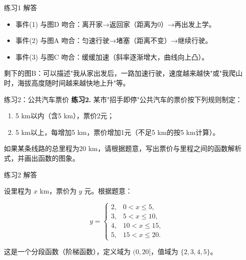 \documentclass[10pt,aspectratio=169,serif]{beamer}
\begin{document}
\begin{frame}[t]{练习1 解答}
\begin{tcolorbox}[colback=orange!10,colframe=orange,title=\textbf{解:}]
\begin{itemize}
  \item 事件(1) 与图\alert{D} 吻合：离开家→返回家（距离为0）→再出发上学。
  \item 事件(2) 与图\alert{A} 吻合：匀速行驶→堵塞（距离不变）→继续行驶。
  \item 事件(3) 与图\alert{C} 吻合：缓缓加速（斜率逐渐增大，曲线向上凸）。
\end{itemize}

\vspace{0.5em}
剩下的图\alert{B}：可以描述"我从家出发后，一路加速行驶，速度越来越快"或"我爬山时，海拔高度随时间越来越快地上升"等。
\end{tcolorbox}
\end{frame}

\begin{frame}[t]{练习2：公共汽车票价}
\textbf{练习2.} 某市"招手即停"公共汽车的票价按下列规则制定：

\begin{enumerate}
  \item 5 km以内（含5 km），票价2元；
  \item 5 km以上，每增加5 km，票价增加1元（不足5 km的按5 km计算）。
\end{enumerate}

如果某条线路的总里程为20 km，请根据题意，写出票价与里程之间的函数解析式，并画出函数的图象。
\end{frame}

\begin{frame}[t]{练习2 解答}
\begin{tcolorbox}[colback=orange!10,colframe=orange,title=\textbf{解:}]
设里程为 $x$ km，票价为 $y$ 元。根据题意：

\[
y =
\begin{cases}
2, & 0 < x \le 5, \\
3, & 5 < x \le 10, \\
4, & 10 < x \le 15, \\
5, & 15 < x \le 20.
\end{cases}
\]

这是一个分段函数（阶梯函数），定义域为 $(0, 20]$，值域为 $\{2, 3, 4, 5\}$。
\end{tcolorbox}
\end{frame}
\end{document}
